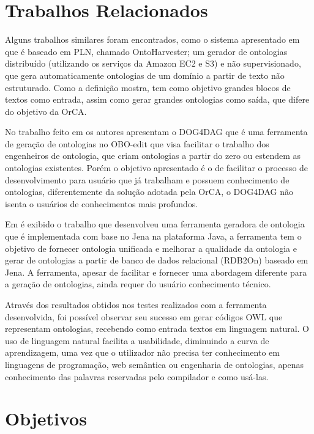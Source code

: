 \documentclass{bcc}
\begin{document}
\section{Trabalhos Relacionados}

Alguns trabalhos similares foram encontrados, como o sistema apresentado em \cite{mousavi2013} que é baseado em PLN, chamado OntoHarvester; um gerador de ontologias distribuído (utilizando os serviços da Amazon EC2 e S3) e não supervisionado, que gera automaticamente ontologias de um domínio a partir de texto não estruturado. Como a definição mostra, tem como objetivo grandes blocos de textos como entrada, assim como gerar grandes ontologias como saída, que difere do objetivo da OrCA. 

No trabalho feito em \cite{wachter2011} os autores apresentam o DOG4DAG que é uma ferramenta de geração de ontologias no OBO-edit \cite{day2007} que visa facilitar o trabalho dos engenheiros de ontologia, que criam ontologias a partir do zero ou estendem as ontologias existentes. Porém o objetivo apresentado é o de facilitar o processo de desenvolvimento para usuário que já trabalham e possuem conhecimento de ontologias, diferentemente da solução adotada pela OrCA, o DOG4DAG não isenta o usuários de conhecimentos mais profundos.

Em \cite{zhou2010} é exibido o trabalho que desenvolveu uma ferramenta geradora de ontologia que é implementada com base no Jena na plataforma Java, a ferramenta tem o objetivo de fornecer ontologia unificada e melhorar a qualidade da ontologia e gerar de ontologias a partir de banco de dados relacional (RDB2On) baseado em Jena\cite{jena}. A ferramenta, apesar de facilitar e fornecer uma abordagem diferente para a geração de ontologias, ainda requer do usuário conhecimento técnico.

Através dos resultados obtidos nos testes realizados com a ferramenta desenvolvida, foi possível observar seu sucesso em gerar códigos OWL que representam ontologias, recebendo como entrada textos em linguagem natural. O uso de linguagem natural facilita a usabilidade, diminuindo a curva de aprendizagem, uma vez que o utilizador não precisa ter conhecimento em linguagens de programação, web semântica ou engenharia de ontologias, apenas conhecimento das palavras reservadas pelo compilador e como usá-las.


\section{Objetivos}
\end{document}

